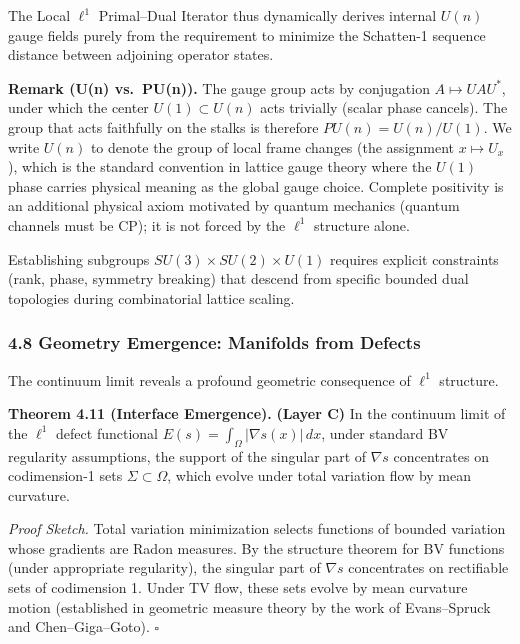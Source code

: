 \documentclass[
]{article}
\begin{document}
The Local \(\ell^1\) Primal--Dual Iterator thus dynamically derives
internal \(U(n)\) gauge fields purely from the requirement to minimize
the Schatten-1 sequence distance between adjoining operator states.

\textbf{Remark (U(n) vs.~PU(n)).} The gauge group acts by conjugation
\(A \mapsto UAU^*\), under which the center \(U(1) \subset U(n)\) acts
trivially (scalar phase cancels). The group that acts faithfully on the
stalks is therefore \(PU(n) = U(n)/U(1)\). We write \(U(n)\) to denote
the group of local frame changes (the assignment \(x \mapsto U_x\)),
which is the standard convention in lattice gauge theory where the
\(U(1)\) phase carries physical meaning as the global gauge choice.
Complete positivity is an additional physical axiom motivated by quantum
mechanics (quantum channels must be CP); it is not forced by the
\(\ell^1\) structure alone.

Establishing subgroups \(SU(3) \times SU(2) \times U(1)\) requires
explicit constraints (rank, phase, symmetry breaking) that descend from
specific bounded dual topologies during combinatorial lattice scaling.

\subsubsection{4.8 Geometry Emergence: Manifolds from
Defects}\label{geometry-emergence-manifolds-from-defects}

The continuum limit reveals a profound geometric consequence of
\(\ell^1\) structure.

\textbf{Theorem 4.11 (Interface Emergence).} \textbf{(Layer C)} In the
continuum limit of the \(\ell^1\) defect functional
\(E(s) = \int_\Omega |\nabla s(x)| \, dx\), under standard BV regularity
assumptions, the support of the singular part of \(\nabla s\)
concentrates on codimension-1 sets \(\Sigma \subset \Omega\), which
evolve under total variation flow by mean curvature.

\emph{Proof Sketch.} Total variation minimization selects functions of
bounded variation whose gradients are Radon measures. By the structure
theorem for BV functions (under appropriate regularity), the singular
part of \(\nabla s\) concentrates on rectifiable sets of codimension 1.
Under TV flow, these sets evolve by mean curvature motion (established
in geometric measure theory by the work of Evans--Spruck and
Chen--Giga--Goto). \(\square\)
\end{document}
